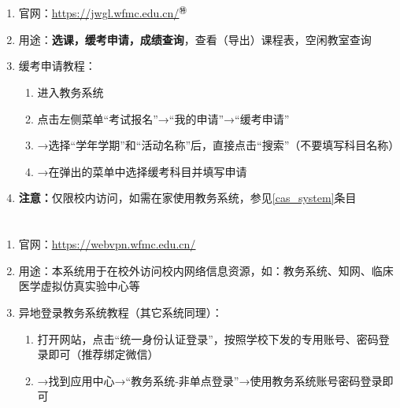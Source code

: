 \section[教务系统]{\textbf{}}
\begin{enumerate}
      \item 官网：\uline{\href{https://jwgl.wfmc.edu.cn/}{https://jwgl.wfmc.edu.cn/}$^㊕$}
      \item 用途：\textbf{选课，缓考申请，成绩查询}，查看（导出）课程表，空闲教室查询
      \item 缓考申请教程：
            \begin{enumerate}
                  \item 进入教务系统
                  \item 点击左侧菜单“考试报名”→“我的申请”→“缓考申请”
                  \item →选择“学年学期”和“活动名称”后，直接点击“搜索”（不要填写科目名称）
                  \item →在弹出的菜单中选择缓考科目并填写申请\footnotemark
            \end{enumerate}
      \item \textbf{注意：}仅限校内访问，如需在家使用教务系统，参见\uline{\ref{cas_system}}条目
\end{enumerate}

\section[资源访问控制系统（校内VPN）]{\textbf{}\footnotemark}
\label{cas_system}
\begin{enumerate}
      \item 官网：\uline{\href{https://webvpn.wfmc.edu.cn/}{https://webvpn.wfmc.edu.cn/}}
      \item 用途：本系统用于在校外访问校内网络信息资源，如：教务系统、知网、临床医学虚拟仿真实验中心\footnotemark 等
      \item 异地登录教务系统教程（其它系统同理）：
            \begin{enumerate}
                  \item 打开网站，点击“统一身份认证登录”，按照学校下发的专用账号、密码登录即可（推荐绑定微信）
                  \item →找到应用中心→“教务系统-非单点登录”\footnotemark →使用教务系统账号密码登录即可
            \end{enumerate}
\end{enumerate}

